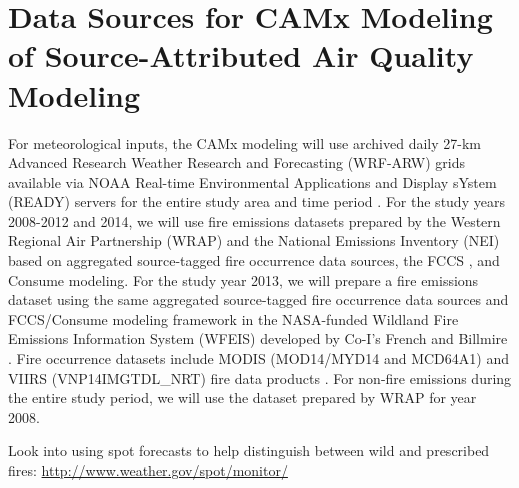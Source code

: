 \section{Data Sources for CAMx Modeling of Source-Attributed Air Quality Modeling}\label{sec:CAMxDataSources}

For meteorological inputs, the CAMx modeling will use archived daily 27-km Advanced Research Weather Research and Forecasting (WRF-ARW) grids available via NOAA Real-time Environmental Applications and Display sYstem (READY) servers for the entire study area and time period \citep{Wang2007,Rolph2017}. For the study years 2008-2012 and 2014, we will use fire emissions datasets prepared by the Western Regional Air Partnership (WRAP) and the National Emissions Inventory (NEI) \citep{EPANEI2017} based on aggregated source-tagged fire occurrence data sources, the FCCS \citep{Ottmar2007}, and Consume \citep{Prichard2009}
modeling. For the study year 2013, we will prepare a fire emissions dataset using the same aggregated source-tagged fire occurrence data sources and FCCS/Consume modeling framework in the NASA-funded  Wildland Fire Emissions Information System (WFEIS) \citep{WFEIS2017} developed by Co-I's French and Billmire \citep{French2014}. Fire occurrence datasets include MODIS  (MOD14/MYD14 and MCD64A1) and  VIIRS (VNP14IMGTDL\_NRT) fire data products \citep{Giglio2006,MODISBurnArea,Schroeder2014}. 
For non-fire emissions during the entire study period, we will use the dataset prepared by WRAP for year 2008.

Look into using spot forecasts to help distinguish between wild and prescribed fires: \url{http://www.weather.gov/spot/monitor/}